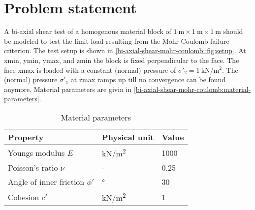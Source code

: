 \section{Problem statement}

A bi-axial shear test of a homogenous material block of $\SI{1}{\metre} \times
    \SI{1}{\metre} \times \SI{1}{\metre}$ should be modeled to test the limit load
resulting from the Mohr-Coulomb failure criterion. The test setup is shown in
\autoref{bi-axial-shear-mohr-coulomb::fig:setup}. At xmin, ymin, ymax, and zmin
the block is fixed perpendicular to the face. The face xmax is loaded with a
constant (normal) pressure of $\sigma'_2 =
    \qty{1}{\kilo\newton\per\square\metre}$. The (normal) pressure $\sigma'_1$ at
zmax ramps up till no convergence can be found anymore. Material parameters are
givin in \autoref{bi-axial-shear-mohr-coulomb:material-parameters}.

\begin{table}[htbp]
    \centering
    \caption{Material parameters}
    \label{bi-axial-shear-mohr-coulomb:material-parameters}
    \begin{tabularx}{\textwidth}{XYY}

        \hline

        Property                        & Physical unit                                         & Value       \\

        \hline

        Youngs modulus $E$              & \si[per-mode = symbol]{\kilo\newton\per\square\metre} &
        \SI{1000}{}                                                                                           \\

        Poisson's ratio $\nu$           & -                                                     & \SI{0.25}{} \\

        Angle of inner friction $\phi'$ & \si[per-mode = symbol]{\degree}                       & \SI{30}{}
        \\

        Cohesion $c'$                   & \si[per-mode = symbol]{\kilo\newton\per\square\metre} & 1           \\

        \hline
    \end{tabularx}
\end{table}

